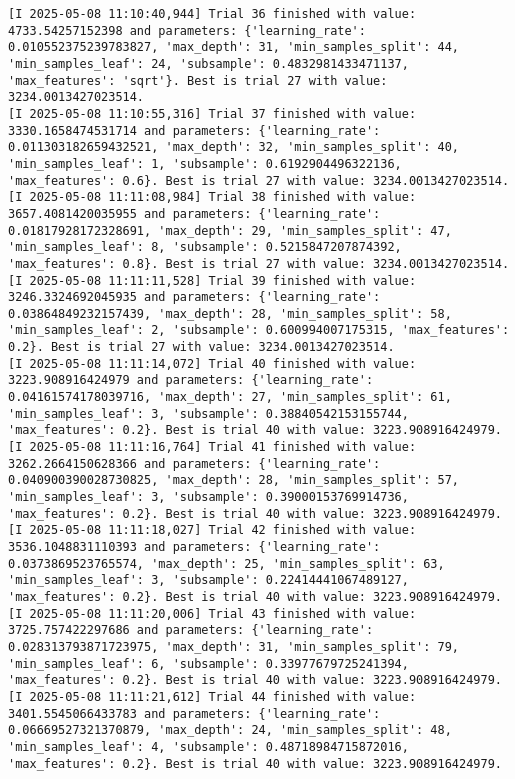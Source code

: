 \documentclass[
  letterpaper,
  DIV=11,
  numbers=noendperiod]{scrreprt}
\begin{document}
\begin{verbatim}
[I 2025-05-08 11:10:40,944] Trial 36 finished with value: 4733.54257152398 and parameters: {'learning_rate': 0.010552375239783827, 'max_depth': 31, 'min_samples_split': 44, 'min_samples_leaf': 24, 'subsample': 0.4832981433471137, 'max_features': 'sqrt'}. Best is trial 27 with value: 3234.0013427023514.
[I 2025-05-08 11:10:55,316] Trial 37 finished with value: 3330.1658474531714 and parameters: {'learning_rate': 0.011303182659432521, 'max_depth': 32, 'min_samples_split': 40, 'min_samples_leaf': 1, 'subsample': 0.6192904496322136, 'max_features': 0.6}. Best is trial 27 with value: 3234.0013427023514.
[I 2025-05-08 11:11:08,984] Trial 38 finished with value: 3657.4081420035955 and parameters: {'learning_rate': 0.01817928172328691, 'max_depth': 29, 'min_samples_split': 47, 'min_samples_leaf': 8, 'subsample': 0.5215847207874392, 'max_features': 0.8}. Best is trial 27 with value: 3234.0013427023514.
[I 2025-05-08 11:11:11,528] Trial 39 finished with value: 3246.3324692045935 and parameters: {'learning_rate': 0.03864849232157439, 'max_depth': 28, 'min_samples_split': 58, 'min_samples_leaf': 2, 'subsample': 0.600994007175315, 'max_features': 0.2}. Best is trial 27 with value: 3234.0013427023514.
[I 2025-05-08 11:11:14,072] Trial 40 finished with value: 3223.908916424979 and parameters: {'learning_rate': 0.04161574178039716, 'max_depth': 27, 'min_samples_split': 61, 'min_samples_leaf': 3, 'subsample': 0.38840542153155744, 'max_features': 0.2}. Best is trial 40 with value: 3223.908916424979.
[I 2025-05-08 11:11:16,764] Trial 41 finished with value: 3262.2664150628366 and parameters: {'learning_rate': 0.040900390028730825, 'max_depth': 28, 'min_samples_split': 57, 'min_samples_leaf': 3, 'subsample': 0.39000153769914736, 'max_features': 0.2}. Best is trial 40 with value: 3223.908916424979.
[I 2025-05-08 11:11:18,027] Trial 42 finished with value: 3536.1048831110393 and parameters: {'learning_rate': 0.0373869523765574, 'max_depth': 25, 'min_samples_split': 63, 'min_samples_leaf': 3, 'subsample': 0.22414441067489127, 'max_features': 0.2}. Best is trial 40 with value: 3223.908916424979.
[I 2025-05-08 11:11:20,006] Trial 43 finished with value: 3725.757422297686 and parameters: {'learning_rate': 0.028313793871723975, 'max_depth': 31, 'min_samples_split': 79, 'min_samples_leaf': 6, 'subsample': 0.33977679725241394, 'max_features': 0.2}. Best is trial 40 with value: 3223.908916424979.
[I 2025-05-08 11:11:21,612] Trial 44 finished with value: 3401.5545066433783 and parameters: {'learning_rate': 0.06669527321370879, 'max_depth': 24, 'min_samples_split': 48, 'min_samples_leaf': 4, 'subsample': 0.48718984715872016, 'max_features': 0.2}. Best is trial 40 with value: 3223.908916424979.

\end{verbatim}
\end{document}

